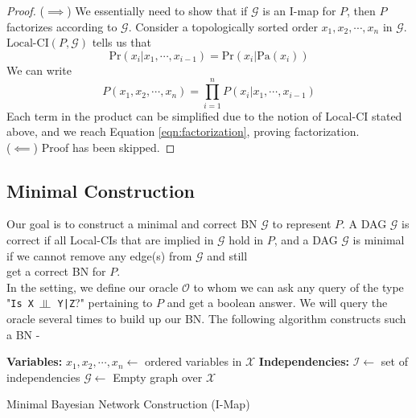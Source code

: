 \begin{proof}
($\implies$) We essentially need to show that if $\mathcal{G}$ is an I-map for $P$, then $P$ factorizes according to $\mathcal G$. Consider a topologically sorted order $x_1, x_2, \cdots, x_n$ in $\mathcal G$. $\text{Local-CI}(P, \mathcal G)$ tells us that $$\text{Pr}(x_i|x_{1}, \cdots, x_{i-1}) = \text{Pr}(x_i|\text{Pa}(x_i))$$
We can write
$$P(x_1, x_2, \cdots, x_n) = \prod_{i=1}^nP(x_i|x_1, \cdots, x_{i-1})$$
Each term in the product can be simplified due to the notion of Local-CI stated above, and we reach Equation \ref{eqn:factorization}, proving factorization. \\
($\impliedby$) Proof has been skipped.
\end{proof}
\subsection{Minimal Construction}
Our goal is to construct a minimal and correct BN $\mathcal G$ to represent $P$. A DAG $\mathcal G$ is correct if all Local-CIs that are implied in $\mathcal G$ hold in $P$, and a DAG $\mathcal G$ is minimal if we cannot remove any edge(s) from $\mathcal G$ and still\\ \noindent get a correct BN for $P$.
\\In the setting, we define our oracle $\mathscr{O}$ to whom we can ask any query of the type "\texttt{Is X $\ind$ Y|Z}?" pertaining to $P$ and get a boolean answer. We will query the oracle several times to build up our BN. The following algorithm constructs such a BN - \\
\begin{algorithm}[H]\label{alg:bn-con}
	\DontPrintSemicolon
	\textbf{Variables:} $x_1, x_2, \cdots, x_n \longleftarrow$ ordered variables in $\mathcal{X}$\;
	\textbf{Independencies:} $\mathcal I \longleftarrow$ set of independencies\;
	$\mathcal G \longleftarrow$ Empty graph over $\mathcal X$\;
	
	\caption{Minimal Bayesian Network Construction (I-Map)}
\end{algorithm}
